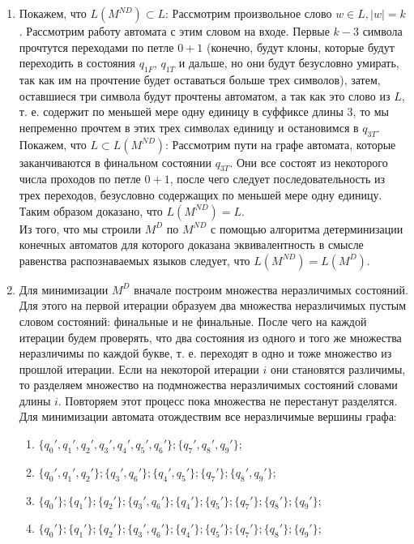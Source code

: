 \begin{enumerate}[label=(\roman{*})]
	\item
		Покажем, что $L(M^{ND}) \subset L$: Рассмотрим произвольное слово $w \in L, |w| = k$. Рассмотрим работу автомата с этим словом на входе. Первые $k-3$ символа прочтутся переходами по петле $0+1$ (конечно, будут клоны, которые будут переходить в состояния $q_{1F}$, $q_{1T}$ и дальше, но они будут безусловно умирать, так как им на прочтение будет оставаться больше трех символов), затем, оставшиеся три символа будут прочтены автоматом, а так как это слово из $L$, т. е. содержит по меньшей мере одну единицу в суффиксе длины $3$, то мы непременно прочтем в этих трех символах единицу и остановимся в $q_{3T}$.\\
		Покажем, что $L \subset L(M^{ND})$: Рассмотрим пути на графе автомата, которые заканчиваются в финальном состоянии $q_{3T}$. Они все состоят из некоторого числа проходов по петле $0+1$, после чего следует последовательность из трех переходов, безусловно содержащих по меньшей мере одну единицу.\\
		Таким образом доказано, что $L(M^{ND}) = L$.\\
		Из того, что мы строили $M^D$ по $M^{ND}$ с помощью алгоритма детерминизации конечных автоматов для которого доказана эквивалентность в смысле равенства распознаваемых языков следует, что $L(M^{ND}) = L(M^D)$.
	\item Для минимизации $M^{D}$ вначале построим множества неразличимых состояний. Для этого на первой итерации образуем два множества неразличимых пустым словом состояний: финальные и не финальные. После чего на каждой итерации будем проверять, что два состояния из одного и того же множества неразличимы по каждой букве, т. е. переходят в одно и тоже множество из прошлой итерации. Если на некоторой итерации $i$ они становятся различимы, то разделяем множество на подмножества неразличимых состояний словами длины $i$. Повторяем этот процесс пока множества не перестанут разделятся. Для минимизации автомата отождествим все неразличимые вершины графа:
		\begin{enumerate}[label={Итерация №\arabic*:},leftmargin=\widthof{Итерация №9:}+\labelsep]
			\item $\{q_0', q_1', q_2', q_3', q_4', q_5', q_6'\}; \{q_7', q_8', q_9'\};$
			\item $\{q_0', q_1', q_2'\}; \{q_3', q_6'\}; \{q_4', q_5'\}; \{q_7'\}; \{q_8', q_9'\};$
			\item $\{q_0'\}; \{q_1'\}; \{q_2'\}; \{q_3', q_6'\}; \{q_4'\}; \{q_5'\}; \{q_7'\}; \{q_8'\}; \{q_9'\};$
			\item $\{q_0'\}; \{q_1'\}; \{q_2'\}; \{q_3', q_6'\}; \{q_4'\}; \{q_5'\}; \{q_7'\}; \{q_8'\}; \{q_9'\};$
		\end{enumerate}
		

\end{enumerate}
